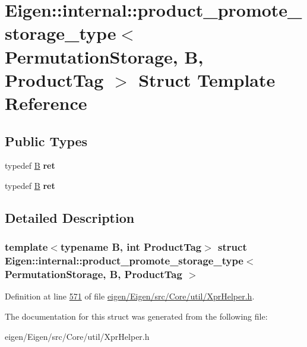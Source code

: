 \hypertarget{struct_eigen_1_1internal_1_1product__promote__storage__type_3_01_permutation_storage_00_01_b_00_01_product_tag_01_4}{}\section{Eigen\+:\+:internal\+:\+:product\+\_\+promote\+\_\+storage\+\_\+type$<$ Permutation\+Storage, B, Product\+Tag $>$ Struct Template Reference}
\label{struct_eigen_1_1internal_1_1product__promote__storage__type_3_01_permutation_storage_00_01_b_00_01_product_tag_01_4}
\subsection*{Public Types}
\begin{DoxyCompactItemize}
\item 
\mbox{\label{struct_eigen_1_1internal_1_1product__promote__storage__type_3_01_permutation_storage_00_01_b_00_01_product_tag_01_4_a8904801ab2506a7e86cd2c7daf10c051}} 
typedef \hyperlink{group___core___module_class_eigen_1_1_matrix}{B} {\bfseries ret}
\item 
\mbox{\label{struct_eigen_1_1internal_1_1product__promote__storage__type_3_01_permutation_storage_00_01_b_00_01_product_tag_01_4_a8904801ab2506a7e86cd2c7daf10c051}} 
typedef \hyperlink{group___core___module_class_eigen_1_1_matrix}{B} {\bfseries ret}
\end{DoxyCompactItemize}


\subsection{Detailed Description}
\subsubsection*{template$<$typename B, int Product\+Tag$>$\newline
struct Eigen\+::internal\+::product\+\_\+promote\+\_\+storage\+\_\+type$<$ Permutation\+Storage, B, Product\+Tag $>$}



Definition at line \hyperlink{eigen_2_eigen_2src_2_core_2util_2_xpr_helper_8h_source_l00571}{571} of file \hyperlink{eigen_2_eigen_2src_2_core_2util_2_xpr_helper_8h_source}{eigen/\+Eigen/src/\+Core/util/\+Xpr\+Helper.\+h}.



The documentation for this struct was generated from the following file\+:\begin{DoxyCompactItemize}
\item 
eigen/\+Eigen/src/\+Core/util/\+Xpr\+Helper.\+h\end{DoxyCompactItemize}
